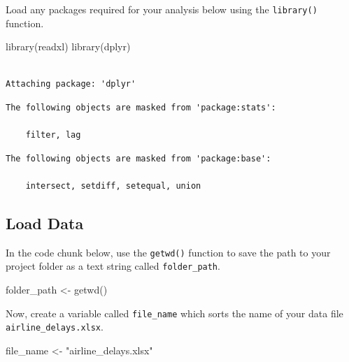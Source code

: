 \documentclass[
  letterpaper,
  DIV=11,
  numbers=noendperiod]{scrartcl}
\newenvironment{Shaded}{\begin{snugshade}}{\end{snugshade}}
\newcommand{\FunctionTok}[1]{\textcolor[rgb]{0.28,0.35,0.67}{#1}}
\newcommand{\NormalTok}[1]{\textcolor[rgb]{0.00,0.23,0.31}{#1}}
\newcommand{\OtherTok}[1]{\textcolor[rgb]{0.00,0.23,0.31}{#1}}
\newcommand{\StringTok}[1]{\textcolor[rgb]{0.13,0.47,0.30}{#1}}
\begin{document}
Load any packages required for your analysis below using the
\texttt{library()} function.

\begin{Shaded}
\begin{Highlighting}[]
\FunctionTok{library}\NormalTok{(readxl)}
\FunctionTok{library}\NormalTok{(dplyr)}
\end{Highlighting}
\end{Shaded}

\begin{verbatim}

Attaching package: 'dplyr'
\end{verbatim}

\begin{verbatim}
The following objects are masked from 'package:stats':

    filter, lag
\end{verbatim}

\begin{verbatim}
The following objects are masked from 'package:base':

    intersect, setdiff, setequal, union
\end{verbatim}

\subsection*{Load Data}\label{load-data}

In the code chunk below, use the \texttt{getwd()} function to save the
path to your project folder as a text string called
\texttt{folder\_path}.

\begin{Shaded}
\begin{Highlighting}[]
\NormalTok{folder\_path }\OtherTok{\textless{}{-}} \FunctionTok{getwd}\NormalTok{()}
\end{Highlighting}
\end{Shaded}

Now, create a variable called \texttt{file\_name} which sorts the name
of your data file \texttt{airline\_delays.xlsx}.

\begin{Shaded}
\begin{Highlighting}[]
\NormalTok{file\_name }\OtherTok{\textless{}{-}} \StringTok{"airline\_delays.xlsx"}
\end{Highlighting}
\end{Shaded}
\end{document}
